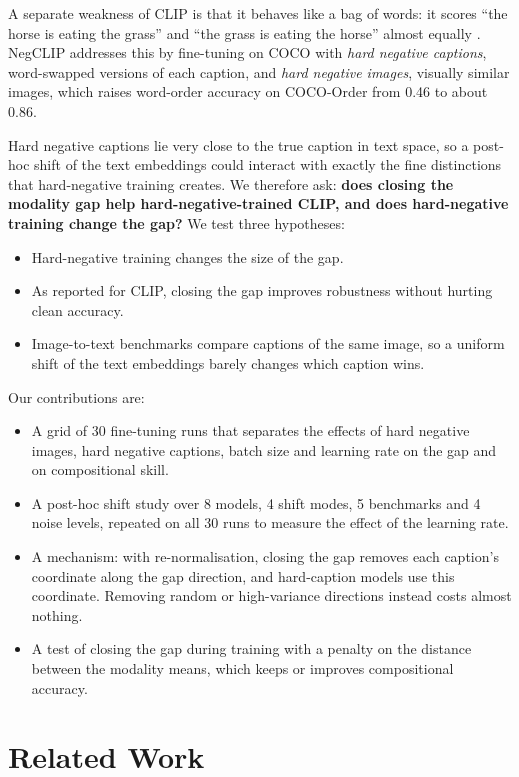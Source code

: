 \documentclass{article}
\begin{document}
A separate weakness of CLIP is that it behaves like a bag of words: it scores ``the horse is eating the grass'' and ``the grass is eating the horse'' almost equally \citep{yuksekgonul2023bow}. NegCLIP addresses this by fine-tuning on COCO with \emph{hard negative captions}, word-swapped versions of each caption, and \emph{hard negative images}, visually similar images, which raises word-order accuracy on COCO-Order from 0.46 to about 0.86.

Hard negative captions lie very close to the true caption in text space, so a post-hoc shift of the text embeddings could interact with exactly the fine distinctions that hard-negative training creates. We therefore ask: \textbf{does closing the modality gap help hard-negative-trained CLIP, and does hard-negative training change the gap?} We test three hypotheses:
\begin{itemize}
\item[\textbf{H1}] Hard-negative training changes the size of the gap.
\item[\textbf{H2}] As reported for CLIP, closing the gap improves robustness without hurting clean accuracy.
\item[\textbf{H3}] Image-to-text benchmarks compare captions of the same image, so a uniform shift of the text embeddings barely changes which caption wins.
\end{itemize}

Our contributions are:
\begin{itemize}
\item A grid of 30 fine-tuning runs that separates the effects of hard negative images, hard negative captions, batch size and learning rate on the gap and on compositional skill.
\item A post-hoc shift study over 8 models, 4 shift modes, 5 benchmarks and 4 noise levels, repeated on all 30 runs to measure the effect of the learning rate.
\item A mechanism: with re-normalisation, closing the gap removes each caption's coordinate along the gap direction, and hard-caption models use this coordinate. Removing random or high-variance directions instead costs almost nothing.
\item A test of closing the gap during training with a penalty on the distance between the modality means, which keeps or improves compositional accuracy.
\end{itemize}

\section{Related Work}
\label{sec:related}
\end{document}
